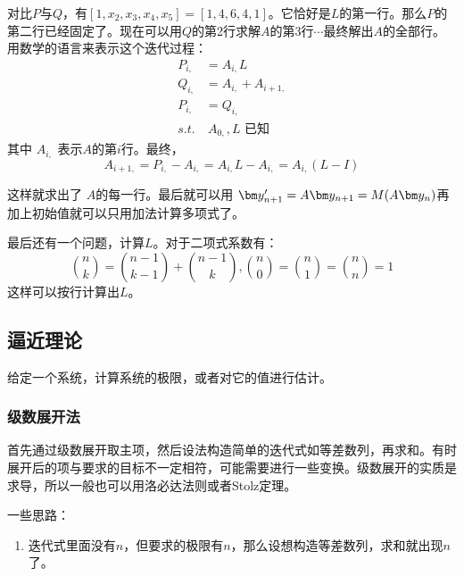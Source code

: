 对比$P$与$Q$，有$[1, x_2,x_3,x_4,x_5]=[1,4, 6,4,1]$。它恰好是$L$的第一行。那么$P$的第二行已经固定了。现在可以用$Q$的第2行求解$A$的第3行$\cdots$最终解出$A$的全部行。 用数学的语言来表示这个迭代过程：
\[\begin{aligned}
	P_{i,}&=A_{i,}L\\
	Q_{i,}&=A_{i,}+A_{i+1,}\\
	P_{i,}&=Q_{i,}
\\
	s.t.&\ A_{0,},L\text{ 已知}
\end{aligned}\]
其中 $A_{i,}$ 表示$A$的第$i$行。最终，
$$A_{i+1,}=P_{i,}-A_{i,}=A_{i,}L-A_{i,}=A_{i,}(L-I)$$ 

这样就求出了 $A$的每一行。最后就可以用 $\by_{n+1}'=A\by_{n+1}=M(A\by_{n})$再加上初始值就可以只用加法计算多项式了。

最后还有一个问题，计算$L$。对于二项式系数有：
$$\binom{n}{k}=\binom{n-1}{k-1}+\binom{n-1}{k},\binom{n}{0}=\binom{n}{1}=\binom{n}{n}=1$$
这样可以按行计算出$L$。
\subsection{逼近理论}
给定一个系统，计算系统的极限，或者对它的值进行估计。

\subsubsection{级数展开法}
首先通过级数展开取主项，然后设法构造简单的迭代式如等差数列，再求和。有时展开后的项与要求的目标不一定相符，可能需要进行一些变换。级数展开的实质是求导，所以一般也可以用洛必达法则或者Stolz定理。

一些思路：
\begin{enumerate}
\item 迭代式里面没有$n$，但要求的极限有$n$，那么设想构造等差数列，求和就出现$n$了。
\end{enumerate}


